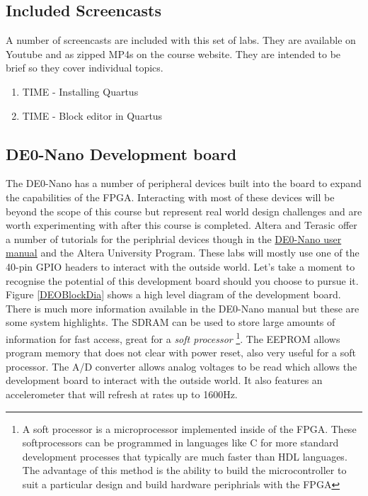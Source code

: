    \subsection{Included Screencasts}
      A number of screencasts are included with this set of labs. They are available on Youtube and as zipped MP4s on the course website. They are intended to be brief so they cover individual topics.
      \begin{enumerate}
        \item TIME - Installing Quartus
        \item TIME - Block editor in Quartus
      \end{enumerate}

    \subsection{DE0-Nano Development board}
      The DE0-Nano has a number of peripheral devices built into the board to expand the capabilities of the FPGA. Interacting with most of these devices will be beyond the scope of this course but represent real world design challenges and are worth experimenting with after this course is completed. Altera and Terasic offer a number of tutorials for the periphrial devices though in the \href{http://www.terasic.com.tw/cgi-bin/page/archive_download.pl?Language=English&No=593&FID=75023fa36c9bf8639384f942e65a46f3}{DE0-Nano user manual} and the Altera University Program. These labs will mostly use one of the 40-pin GPIO headers to interact with the outside world. Let's take a moment to recognise the potential of this development board should you choose to pursue it. Figure \ref{DEOBlockDia} shows a high level diagram of the development board. There is much more information available in the DE0-Nano manual but these are some system highlights. The SDRAM can be used to store large amounts of information for fast access, great for a {\it soft processor} \footnote{A soft processor is a microprocessor implemented inside of the FPGA. These softprocessors can be programmed in languages like C for more standard development processes that typically are much faster than HDL languages. The advantage of this method is the ability to build the microcontroller to suit a particular design and build hardware periphrials with the FPGA}. The EEPROM allows program memory that does not clear with power reset, also very useful for a soft processor. The A/D converter allows analog voltages to be read which allows the development board to interact with the outside world. It also features an accelerometer that will refresh at rates up to 1600Hz.      
